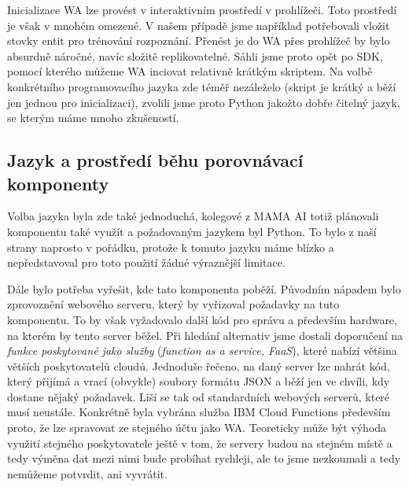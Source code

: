 Inicializace WA lze provést v interaktivním prostředí v prohlížeči. Toto
prostředí je však v mnohém omezené. V našem případě jsme například potřebovali
vložit stovky entit pro trénování rozpoznání. Přenést je do WA přes prohlížeč
by bylo absurdně náročné, navíc složitě replikovatelné. Sáhli jsme proto opět
po SDK, pomocí kterého můžeme WA inciovat relativně krátkým skriptem. Na volbě
konkrétního programovacího jazyka zde téměř nezáleželo (skript je krátký a běží
jen jednou pro inicializaci), zvolili jsme proto Python jakožto dobře čitelný
jazyk, se kterým máme mnoho zkušeností.

\subsection{Jazyk a prostředí běhu porovnávací komponenty}

Volba jazyka byla zde také jednoduchá, kolegové z MAMA AI totiž plánovali
komponentu také využít a požadovaným jazykem byl Python. To bylo z naší
strany naprosto v pořádku, protože k tomuto jazyku máme blízko a nepředstavoval
pro toto použití žádné výraznější limitace.

Dále bylo potřeba vyřešit, kde tato komponenta poběží. Původním nápadem bylo
zprovoznění webového serveru, který by vyřizoval požadavky na tuto komponentu.
To by však vyžadovalo další kód pro správu a především hardware, na kterém by
tento server běžel. Při hledání alternativ jsme dostali doporučení na
\textit{funkce poskytované jako služby} (\textit{function as a service, FaaS}),
které nabízí většina větších poskytovatelů cloudů. Jednoduše řečeno, na daný
server lze nahrát kód, který přijímá a vrací (obvykle) soubory formátu JSON a
běží jen ve chvíli, kdy dostane nějaký požadavek. Liší se tak od standardních
webových serverů, které musí  neustále. Konkrétně byla vybrána
služba IBM Cloud Functions především proto, že lze spravovat ze stejného účtu jako
WA. Teoreticky může být výhoda využití stejného poskytovatele ještě v tom, že
servery budou na stejném místě a tedy výměna dat mezi nimi bude probíhat rychleji,
ale to jsme nezkoumali a tedy nemůžeme potvrdit, ani vyvrátit.